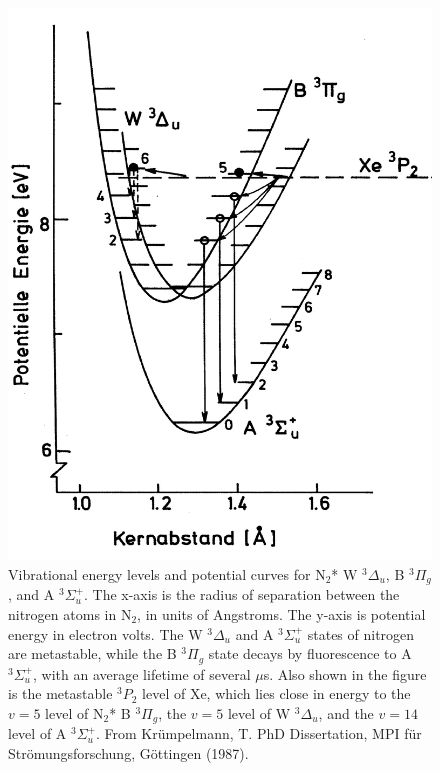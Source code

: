 \documentclass[12pt]{mitthesis}
\begin{document}
\begin{figure}
  \caption{Vibrational energy levels and potential curves for N$_2$* W
    $^3\Delta_u$, B $^3\Pi_g$, and A $^3\Sigma_u^+$.  The x-axis is
    the radius of separation between the nitrogen atoms in N$_2$, in
    units of Angstroms.  The y-axis is potential energy in electron
    volts.  The W $^3\Delta_u$ and A $^3\Sigma_u^+$ states of nitrogen are
    metastable, while the B $^3\Pi_g$ state decays by fluorescence to
    A $^3\Sigma_u^+$, with an average lifetime of several $\mu$s.
    Also shown in the figure is the metastable $^3P_2$ level of Xe,
    which lies close in energy to the $v=5$ level of N$_2$* B
    $^3\Pi_g$, the $v=5$ level of W $^3\Delta_u$, and the $v=14$ level
    of A $^3\Sigma_u^+$.  From Kr\"{u}mpelmann, T. PhD Dissertation,
    MPI f\"{u}r Str\"{o}mungsforschung, G\"{o}ttingen (1987).}
  \label{fig:n2curves}
  \centering
  \includegraphics[width=5in]{n2curves.png}
\end{figure}
\end{document}
